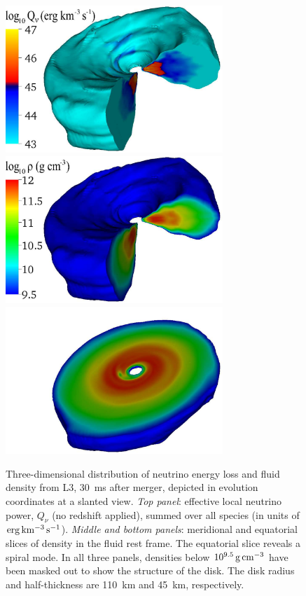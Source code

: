 \begin{figure}
\includegraphics[width=8.2cm]{Figures/3D-Q0phys_meridional}
\includegraphics[width=8.2cm]{Figures/3D-rho0phys_meridional}
\includegraphics[width=8.2cm]{Figures/3D-rho0phys_equatorial}
\caption[Three dimensional colorplots of disk density and neutrino energy losses]{
Three-dimensional distribution of neutrino energy loss and fluid density
from L3, 30~ms after merger, depicted in evolution coordinates at a slanted view.
{\em Top panel}: effective local neutrino power, $Q_{\nu}$ (no redshift applied),
summed over all species (in units of $\rm erg\,km^{-3}\,s^{-1}$).
{\em Middle and bottom panels}: meridional and equatorial slices of
density in the fluid rest frame. The equatorial slice reveals a spiral mode.
In all three panels, densities below $10^{9.5}\rm\,g\,cm^{-3}$ have been masked out
to show the structure of the disk. The disk radius and half-thickness
are 110~km and 45~km, respectively.
}
\label{fig:disksnapshot}
\end{figure}

